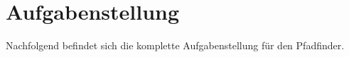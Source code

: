 \newpage
\section{Aufgabenstellung} \label{aufgabenstellung}

Nachfolgend befindet sich die komplette Aufgabenstellung für den Pfadfinder.

